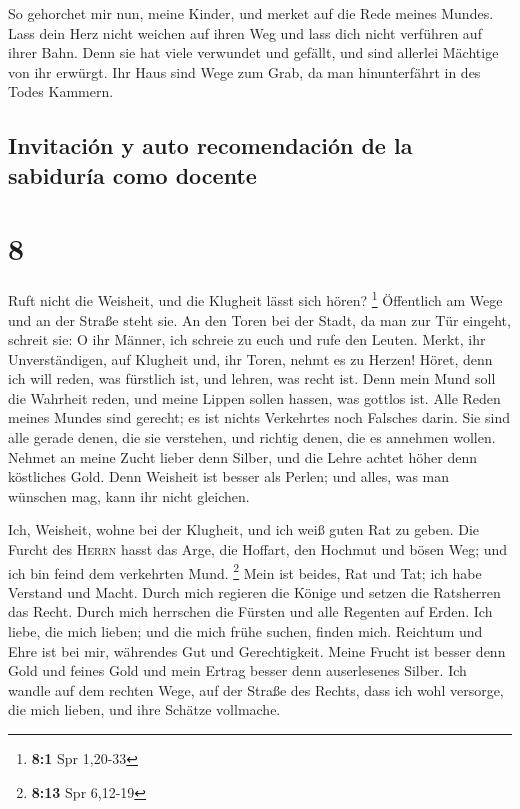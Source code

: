  So gehorchet mir nun, meine Kinder, und merket auf die
Rede meines Mundes.  Lass dein Herz nicht weichen auf
ihren Weg und lass dich nicht verführen auf ihrer Bahn. 
Denn sie hat viele verwundet und gefällt, und sind allerlei Mächtige von
ihr erwürgt.  Ihr Haus sind Wege zum Grab, da man
hinunterfährt in des Todes Kammern.

\hypertarget{invitaciuxf3n-y-auto-recomendaciuxf3n-de-la-sabiduruxeda-como-docente}{%
\subsection{Invitación y auto recomendación de la sabiduría como
docente}\label{invitaciuxf3n-y-auto-recomendaciuxf3n-de-la-sabiduruxeda-como-docente}}

\hypertarget{section-7}{%
\section{8}\label{section-7}}

 Ruft nicht die Weisheit, und die Klugheit lässt sich
hören? \footnote{\textbf{8:1} Spr 1,20-33}  Öffentlich am
Wege und an der Straße steht sie.  An den Toren bei der
Stadt, da man zur Tür eingeht, schreit sie:  O ihr Männer,
ich schreie zu euch und rufe den Leuten.  Merkt, ihr
Unverständigen, auf Klugheit und, ihr Toren, nehmt es zu Herzen!
 Höret, denn ich will reden, was fürstlich ist, und
lehren, was recht ist.  Denn mein Mund soll die Wahrheit
reden, und meine Lippen sollen hassen, was gottlos ist. 
Alle Reden meines Mundes sind gerecht; es ist nichts Verkehrtes noch
Falsches darin.  Sie sind alle gerade denen, die sie
verstehen, und richtig denen, die es annehmen wollen. 
Nehmet an meine Zucht lieber denn Silber, und die Lehre achtet höher
denn köstliches Gold.  Denn Weisheit ist besser als
Perlen; und alles, was man wünschen mag, kann ihr nicht gleichen.

 Ich, Weisheit, wohne bei der Klugheit, und ich weiß
guten Rat zu geben.  Die Furcht des \textsc{Herrn} hasst
das Arge, die Hoffart, den Hochmut und bösen Weg; und ich bin feind dem
verkehrten Mund. \footnote{\textbf{8:13} Spr 6,12-19} 
Mein ist beides, Rat und Tat; ich habe Verstand und Macht.
 Durch mich regieren die Könige und setzen die Ratsherren
das Recht.  Durch mich herrschen die Fürsten und alle
Regenten auf Erden.  Ich liebe, die mich lieben; und die
mich frühe suchen, finden mich.  Reichtum und Ehre ist
bei mir, währendes Gut und Gerechtigkeit.  Meine Frucht
ist besser denn Gold und feines Gold und mein Ertrag besser denn
auserlesenes Silber.  Ich wandle auf dem rechten Wege,
auf der Straße des Rechts,  dass ich wohl versorge, die
mich lieben, und ihre Schätze vollmache.

